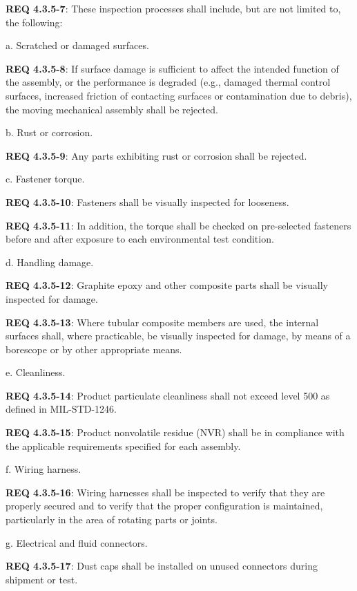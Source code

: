 \documentclass[12pt]{article}
\begin{document}
\noindent \textbf{REQ 4.3.5-7}: These inspection processes shall include, but are not limited to, the following:

a. Scratched or damaged surfaces. 

\noindent \textbf{REQ 4.3.5-8}: If surface damage is sufficient to affect the intended function of the assembly, or the performance is degraded (e.g., damaged thermal control surfaces, increased friction of contacting surfaces or contamination due to debris), the moving mechanical assembly shall be rejected.

b. Rust or corrosion.

\noindent \textbf{REQ 4.3.5-9}: Any parts exhibiting rust or corrosion shall be rejected.

c. Fastener torque. 

\noindent \textbf{REQ 4.3.5-10}: Fasteners shall be visually inspected for looseness. 

\noindent \textbf{REQ 4.3.5-11}: In addition, the torque shall be checked on pre-selected fasteners before and after exposure to each environmental test condition.

d. Handling damage. 

\noindent \textbf{REQ 4.3.5-12}: Graphite epoxy and other composite parts shall be visually inspected for damage. 

\noindent \textbf{REQ 4.3.5-13}: Where tubular composite members are used, the internal surfaces shall, where practicable, be visually inspected for damage, by means of a borescope or by other appropriate means.

e. Cleanliness. 

\noindent \textbf{REQ 4.3.5-14}: Product particulate cleanliness shall not exceed level 500 as defined in MIL-STD-1246.

\noindent \textbf{REQ 4.3.5-15}: Product nonvolatile residue (NVR) shall be in compliance with the applicable requirements specified for each assembly.

f. Wiring harness. 

\noindent \textbf{REQ 4.3.5-16}: Wiring harnesses shall be inspected to verify that they are properly secured and to verify that the proper configuration is maintained, particularly in the area of rotating parts or joints.

g. Electrical and fluid connectors. 

\noindent \textbf{REQ 4.3.5-17}: Dust caps shall be installed on unused connectors during shipment or test. 
\end{document}

